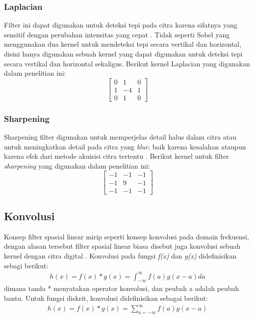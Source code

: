 \subsubsection{Laplacian}
Filter ini dapat digunakan untuk deteksi tepi pada citra karena sifatnya yang sensitif dengan perubahan intensitas yang cepat . Tidak seperti Sobel yang menggunakan dua kernel untuk mendeteksi tepi secara vertikal dan horizontal, disini hanya digunakan sebuah kernel yang dapat digunakan untuk deteksi tepi secara vertikal dan horizontal sekaligus. Berikut kernel Laplacian yang digunakan dalam penelitian ini:
\begin{equation}
    \label{kernel:laplacian}
    \left[
    \begin{matrix}
 0 & 1 & 0 \\
 1 & -4 & 1 \\
 0 & 1 & 0
    \end{matrix}
    \right]
\end{equation}

\subsubsection{Sharpening}
Sharpening filter digunakan untuk memperjelas detail halus dalam citra atau untuk meningkatkan detail pada citra yang \textit{blur}, baik karena kesalahan ataupun karena efek dari metode akuisisi citra tertentu . Berikut kernel untuk filter \textit{sharpening} yang digunakan dalam penelitian ini:
\begin{equation}
    \label{kernel:sharpen}
    \left[
    \begin{matrix}
 -1 & -1 & -1 \\
 -1 & 9 & -1 \\
 -1 & -1 & -1
    \end{matrix}
    \right]
\end{equation}


\subsection{Konvolusi}
Konsep filter spasial linear mirip seperti konsep konvolusi pada domain frekuensi, dengan alasan tersebut filter spasial linear biasa disebut juga konvolusi sebuah kernel dengan citra digital . Konvolusi pada fungsi \textit{f(x)} dan \textit{g(x)} didefinisikan sebagi berikut:
\begin{equation}
    \label{eq:conv1}
    \begin{split}
h(x) = f(x) * g(x) = \int_{-\infty}^{\infty} f(a) g(x-a) da
    \end{split}
\end{equation}
dimana tanda * menyatakan operator konvolusi, dan peubah a adalah peubah bantu. Untuk fungsi diskrit, konvolusi didefinisikan sebagai berikut:
\begin{equation}
    \label{eq:conv2}
    \begin{split}
h(x) = f(x) * g(x) = \sum_{a=-\infty}^{\infty} f(a)g(x-a)
    \end{split}
\end{equation}

